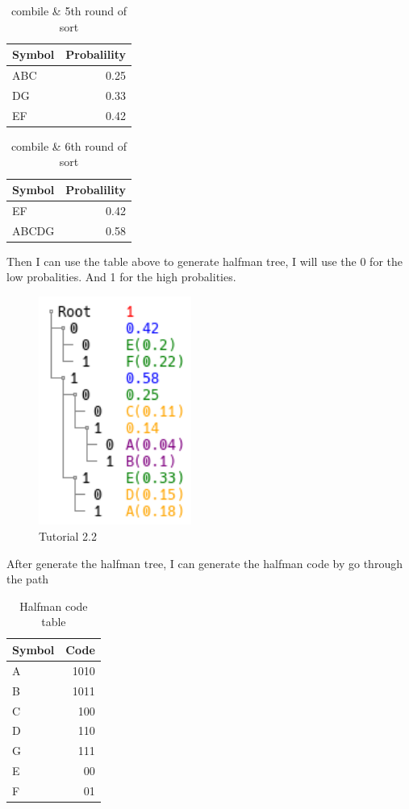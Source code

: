 \documentclass[titlepage]{article}
\begin{document}
\begin{table}[htbp]
\caption{\label{fig:label}combile \& 5th round of sort}
\centering
\begin{tabular}{lr}
Symbol & Probalility\\
\hline
ABC & 0.25\\
DG & 0.33\\
EF & 0.42\\
\end{tabular}
\end{table}

\begin{table}[htbp]
\caption{\label{fig:label}combile \& 6th round of sort}
\centering
\begin{tabular}{lr}
Symbol & Probalility\\
\hline
EF & 0.42\\
ABCDG & 0.58\\
\end{tabular}
\end{table}

Then I can use the table above to generate halfman tree, I will use the 0 for the low probalities. And 1 for the high probalities.

\begin{figure}[htbp]
\centering
\includegraphics[width=5cm]{img/btree2.png}
\caption{\label{fig:2}Tutorial 2.2}
\end{figure}

After generate the halfman tree, I can generate the halfman code by go through the path

\begin{table}[htbp]
\caption{Halfman code table}
\centering
\begin{tabular}{lr}
Symbol & Code\\
\hline
A & 1010\\
B & 1011\\
C & 100\\
D & 110\\
G & 111\\
E & 00\\
F & 01\\
\end{tabular}
\end{table}
\end{document}
